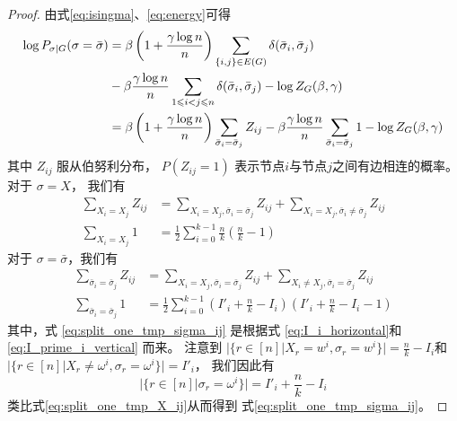 \begin{proof}
  由式\eqref{eq:isingma}、\eqref{eq:energy}可得
	\begin{align}
  \log P_{\sigma|G}(\sigma=\bar{\sigma})
  & = 
  \beta\left(1 + \frac{\gamma \log n}{n}\right) \sum_{\{i,j\} \in E(G)}  \delta(\bar{\sigma}_i, \bar{\sigma}_j)  
	\notag\\
  &\quad- \beta\frac{\gamma \log n}{n} \sum_{1\leq i<j \leq n} \delta(\bar{\sigma}_i, \bar{\sigma}_j) 
  - \log Z_G(\beta, \gamma) \notag\\
  & = 
  \beta\left(1 + \frac{\gamma \log n}{n}\right) \sum_{\bar{\sigma}_i = \bar{\sigma}_j} Z_{ij}
	- \beta\frac{\gamma \log n}{n}
  \sum_{\bar{\sigma}_i = \bar{\sigma}_j} 1 
  - \log Z_G(\beta, \gamma)
  \label{eq:log_P_sigma_G_bar_sigma}
  \end{align}
	其中 $Z_{ij}$ 服从伯努利分布，
  $P(Z_{ij}=1)$ 表示节点$i$与节点$j$之间有边相连的概率。
	对于 $\sigma = X$， 我们有
	\begin{align}
	\sum_{X_i = X_j} Z_{ij} &
  = \sum_{X_i = X_j, \bar{\sigma}_i = \bar{\sigma}_j}
  Z_{ij} + \sum_{X_i = X_j, \bar{\sigma}_i \neq \bar{\sigma}_j}
  Z_{ij}
  \label{eq:split_zij_tmp_X_ij}\\
	\sum_{X_i = X_j} 1 &= \frac{1}{2} \sum_{i=0}^{k-1} \frac{n}{k} 
  \left( \frac{n}{k} - 1 
  \right)\label{eq:split_one_tmp_X_ij}
	\end{align}
	对于 $\sigma = \bar{\sigma}$，我们有
	\begin{align}
	\sum_{\bar{\sigma}_i = \bar{\sigma}_j} Z_{ij} &= \sum_{X_i = X_j, \bar{\sigma}_i = \bar{\sigma}_j} Z_{ij} + \sum_{X_i \neq X_j, \bar{\sigma}_i = \bar{\sigma}_j} Z_{ij} 
  \label{eq:split_zij_tmp_sigma_ij}\\
	\sum_{\bar{\sigma}_i = \bar{\sigma}_j} 1 &= \frac{1}{2} \sum_{i=0}^{k-1} 
  \left(I'_i + \frac{n}{k} - I_i \right)
  \left( I'_i + \frac{n}{k} - I_i - 1 \right)
  \label{eq:split_one_tmp_sigma_ij}
	\end{align}
  其中，式 \eqref{eq:split_one_tmp_sigma_ij} 是根据式
  \eqref{eq:I_i_horizontal}和 \eqref{eq:I_prime_i_vertical}
  而来。
	注意到
  $
  \Big|\{r\in [n] \big| X_r = w^i, \sigma_r=w^i \}\Big|
  =\frac{n}{k} - I_i$和
	$|\{r\in [n] | X_r \neq \omega^i, \sigma_r = \omega^i \}| = I'_i$，
	我们因此有  
  \begin{equation}\label{eq:number_of_sigma_r_equal_omega_i}
    |\{r\in [n] | \sigma_r = \omega^i \}|
    = I'_i + \frac{n}{k} - I_i
  \end{equation}
  类比式\eqref{eq:split_one_tmp_X_ij}从而得到
  式\eqref{eq:split_one_tmp_sigma_ij}。


\end{proof}
